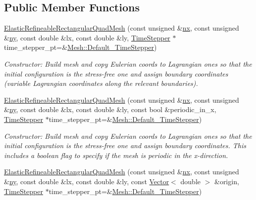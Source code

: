 \subsection*{Public Member Functions}
\begin{DoxyCompactItemize}
\item 
\hyperlink{classoomph_1_1ElasticRefineableRectangularQuadMesh_aa3d9df728974ce172bf942bc4f6c1a2d}{Elastic\+Refineable\+Rectangular\+Quad\+Mesh} (const unsigned \&\hyperlink{classoomph_1_1RectangularQuadMesh_abfef93d6322886cdce14a437186e4821}{nx}, const unsigned \&\hyperlink{classoomph_1_1RectangularQuadMesh_a86d76a55eb7c4e8bca9b74d23c8b0412}{ny}, const double \&lx, const double \&ly, \hyperlink{classoomph_1_1TimeStepper}{Time\+Stepper} $\ast$time\+\_\+stepper\+\_\+pt=\&\hyperlink{classoomph_1_1Mesh_a12243d0fee2b1fcee729ee5a4777ea10}{Mesh\+::\+Default\+\_\+\+Time\+Stepper})
\begin{DoxyCompactList}\small\item\em Constructor\+: Build mesh and copy Eulerian coords to Lagrangian ones so that the initial configuration is the stress-\/free one and assign boundary coordinates (variable Lagrangian coordinates along the relevant boundaries). \end{DoxyCompactList}\item 
\hyperlink{classoomph_1_1ElasticRefineableRectangularQuadMesh_a8925d6c0eb669afc420564a4610b34bd}{Elastic\+Refineable\+Rectangular\+Quad\+Mesh} (const unsigned \&\hyperlink{classoomph_1_1RectangularQuadMesh_abfef93d6322886cdce14a437186e4821}{nx}, const unsigned \&\hyperlink{classoomph_1_1RectangularQuadMesh_a86d76a55eb7c4e8bca9b74d23c8b0412}{ny}, const double \&lx, const double \&ly, const bool \&periodic\+\_\+in\+\_\+x, \hyperlink{classoomph_1_1TimeStepper}{Time\+Stepper} $\ast$time\+\_\+stepper\+\_\+pt=\&\hyperlink{classoomph_1_1Mesh_a12243d0fee2b1fcee729ee5a4777ea10}{Mesh\+::\+Default\+\_\+\+Time\+Stepper})
\begin{DoxyCompactList}\small\item\em Constructor\+: Build mesh and copy Eulerian coords to Lagrangian ones so that the initial configuration is the stress-\/free one and assign boundary coordinates. This includes a boolean flag to specify if the mesh is periodic in the x-\/direction. \end{DoxyCompactList}\item 
\hyperlink{classoomph_1_1ElasticRefineableRectangularQuadMesh_a1cea0e91f2d8687182a8f5de6737a511}{Elastic\+Refineable\+Rectangular\+Quad\+Mesh} (const unsigned \&\hyperlink{classoomph_1_1RectangularQuadMesh_abfef93d6322886cdce14a437186e4821}{nx}, const unsigned \&\hyperlink{classoomph_1_1RectangularQuadMesh_a86d76a55eb7c4e8bca9b74d23c8b0412}{ny}, const double \&lx, const double \&ly, const \hyperlink{classoomph_1_1Vector}{Vector}$<$ double $>$ \&origin, \hyperlink{classoomph_1_1TimeStepper}{Time\+Stepper} $\ast$time\+\_\+stepper\+\_\+pt=\&\hyperlink{classoomph_1_1Mesh_a12243d0fee2b1fcee729ee5a4777ea10}{Mesh\+::\+Default\+\_\+\+Time\+Stepper})

\end{DoxyCompactItemize}
